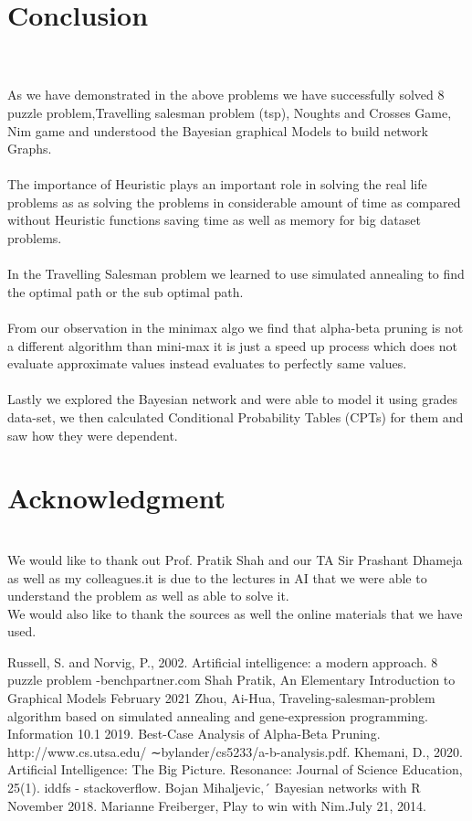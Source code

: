 \documentclass[conference]{IEEEtran}
\begin{document}
\section*{Conclusion}
\\
\\
As we have demonstrated in the above problems we have successfully solved 8 puzzle problem,Travelling salesman problem (tsp), Noughts and Crosses Game, Nim game and understood the Bayesian graphical Models to build network Graphs.
\\
\\
The importance of Heuristic plays an important role in solving the real life problems as as solving the problems in considerable amount of time as compared without Heuristic functions saving time as well as memory for big dataset problems.
\\
\\
In the Travelling Salesman problem we learned to use simulated annealing to find the optimal path or the sub optimal path.
\\
\\
From our observation in the minimax algo we find that alpha-beta pruning is not a different algorithm than mini-max it is just a speed up process which does not evaluate approximate values instead evaluates to perfectly same values.
\\
\\
Lastly we explored the Bayesian network and were able to model it using grades data-set, we then calculated Conditional Probability Tables (CPTs) for them and saw how they were dependent.


\section*{Acknowledgment}
\\
We would like to thank out Prof. Pratik Shah and our TA Sir Prashant Dhameja as well as my colleagues.it is due to the lectures in AI that we were able to understand the problem as well as able to solve it.
\\
We would also like to thank the sources as well the online materials that we have used.

\begin{thebibliography}{00}
 Russell, S. and Norvig, P., 2002. Artificial intelligence: a modern approach.
8 puzzle problem -benchpartner.com
Shah Pratik, An Elementary Introduction to Graphical Models February
2021
Zhou, Ai-Hua, Traveling-salesman-problem algorithm based on simulated annealing and gene-expression programming. Information 10.1 2019.
 Best-Case Analysis of Alpha-Beta Pruning. http://www.cs.utsa.edu/ ∼bylander/cs5233/a-b-analysis.pdf.
 Khemani, D., 2020. Artificial Intelligence: The Big Picture. Resonance: Journal of Science Education, 25(1).
iddfs - stackoverflow.
Bojan Mihaljevic,´ Bayesian networks with R November 2018.
Marianne Freiberger, Play to win with Nim.July 21, 2014.
\end{thebibliography}
\vspace{12pt}
\end{document}
